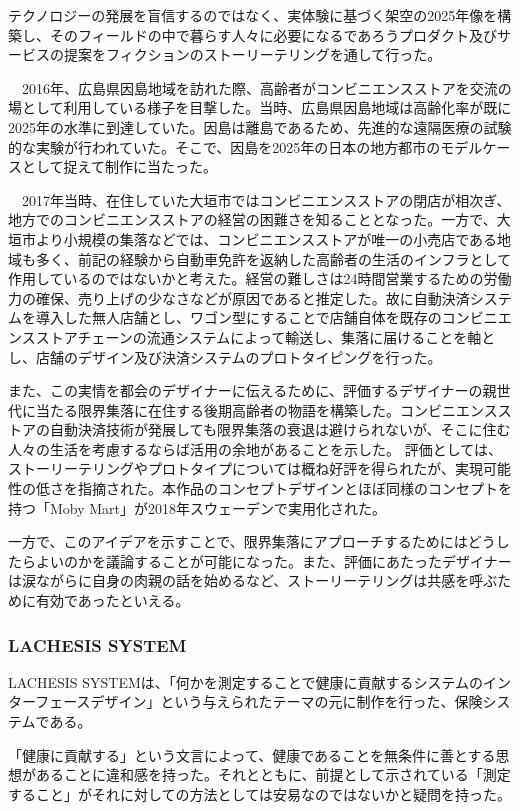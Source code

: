 \documentclass{jsarticle}
\begin{document}
 テクノロジーの発展を盲信するのではなく、実体験に基づく架空の2025年像を構築し、そのフィールドの中で暮らす人々に必要になるであろうプロダクト及びサービスの提案をフィクションのストーリーテリングを通して行った。

　2016年、広島県因島地域を訪れた際、高齢者がコンビニエンスストアを交流の場として利用している様子を目撃した。当時、広島県因島地域は高齢化率が既に2025年の水準に到達していた。因島は離島であるため、先進的な遠隔医療の試験的な実験が行われていた。そこで、因島を2025年の日本の地方都市のモデルケースとして捉えて制作に当たった。

　2017年当時、在住していた大垣市ではコンビニエンスストアの閉店が相次ぎ、地方でのコンビニエンスストアの経営の困難さを知ることとなった。一方で、大垣市より小規模の集落などでは、コンビニエンスストアが唯一の小売店である地域も多く、前記の経験から自動車免許を返納した高齢者の生活のインフラとして作用しているのではないかと考えた。経営の難しさは24時間営業するための労働力の確保、売り上げの少なさなどが原因であると推定した。故に自動決済システムを導入した無人店舗とし、ワゴン型にすることで店舗自体を既存のコンビニエンスストアチェーンの流通システムによって輸送し、集落に届けることを軸とし、店舗のデザイン及び決済システムのプロトタイピングを行った。

 また、この実情を都会のデザイナーに伝えるために、評価するデザイナーの親世代に当たる限界集落に在住する後期高齢者の物語を構築した。コンビニエンスストアの自動決済技術が発展しても限界集落の衰退は避けられないが、そこに住む人々の生活を考慮するならば活用の余地があることを示した。
 評価としては、ストーリーテリングやプロトタイプについては概ね好評を得られたが、実現可能性の低さを指摘された。本作品のコンセプトデザインとほぼ同様のコンセプトを持つ「Moby Mart」が2018年スウェーデンで実用化された。

 一方で、このアイデアを示すことで、限界集落にアプローチするためにはどうしたらよいのかを議論することが可能になった。また、評価にあたったデザイナーは涙ながらに自身の肉親の話を始めるなど、ストーリーテリングは共感を呼ぶために有効であったといえる。


 \subsubsection{LACHESIS SYSTEM}
LACHESIS SYSTEMは、「何かを測定することで健康に貢献するシステムのインターフェースデザイン」という与えられたテーマの元に制作を行った、保険システムである。

「健康に貢献する」という文言によって、健康であることを無条件に善とする思想があることに違和感を持った。それとともに、前提として示されている「測定すること」がそれに対しての方法としては安易なのではないかと疑問を持った。
\end{document}
